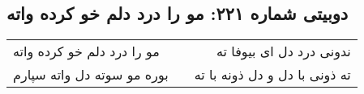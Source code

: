 \begin{center}
\section*{دوبیتی شماره ۲۲۱: مو را درد دلم خو کرده واته}
\label{sec:221}
\begin{longtable}{l p{0.5cm} r}
مو را درد دلم خو کرده واته
&&
ندونی درد دل ای بیوفا ته
\\
بوره مو سوته دل واته سپارم
&&
ته ذونی با دل و دل ذونه با ته
\\
\end{longtable}
\end{center}
